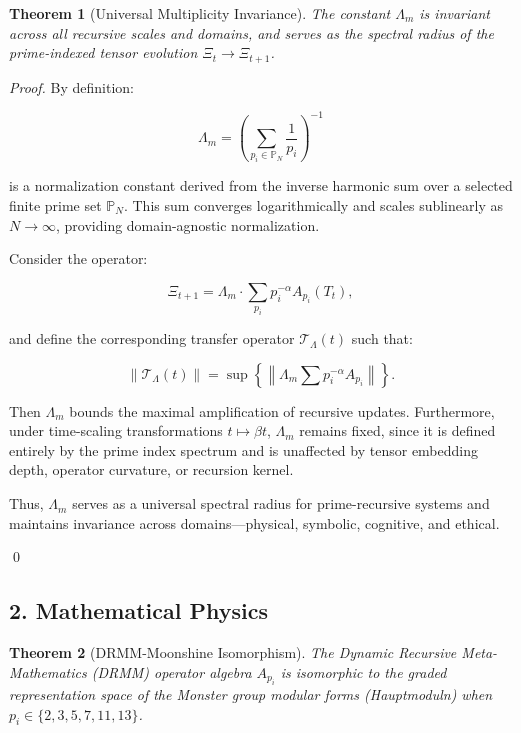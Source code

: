 \documentclass{article}
\theoremstyle{plain}
\newtheorem{theorem}{Theorem}
\begin{document}
\begin{theorem}[Universal Multiplicity Invariance]
The constant \( \Lambda_m \) is invariant across all recursive scales and domains, and serves as the spectral radius of the prime-indexed tensor evolution \( \Xi_t \rightarrow \Xi_{t+1} \).
\end{theorem}

\begin{proof}
By definition:

\[
\Lambda_m = \left( \sum_{p_i \in \mathbb{P}_N} \frac{1}{p_i} \right)^{-1}
\]

is a normalization constant derived from the inverse harmonic sum over a selected finite prime set \( \mathbb{P}_N \). This sum converges logarithmically and scales sublinearly as \( N \to \infty \), providing domain-agnostic normalization.

Consider the operator:

\[
\Xi_{t+1} = \Lambda_m \cdot \sum_{p_i} p_i^{-\alpha} A_{p_i}(T_t),
\]

and define the corresponding transfer operator \( \mathcal{T}_{\Lambda}(t) \) such that:

\[
\|\mathcal{T}_{\Lambda}(t)\| = \sup \left\{ \left\| \Lambda_m \sum p_i^{-\alpha} A_{p_i} \right\| \right\}.
\]

Then \( \Lambda_m \) bounds the maximal amplification of recursive updates. Furthermore, under time-scaling transformations \( t \mapsto \beta t \), \( \Lambda_m \) remains fixed, since it is defined entirely by the prime index spectrum and is unaffected by tensor embedding depth, operator curvature, or recursion kernel.

Thus, \( \Lambda_m \) serves as a universal spectral radius for prime-recursive systems and maintains invariance across domains—physical, symbolic, cognitive, and ethical.

\qed
\end{proof}


\subsection{2. Mathematical Physics}

\begin{theorem}[DRMM-Moonshine Isomorphism]
The Dynamic Recursive Meta-Mathematics (DRMM) operator algebra \( A_{p_i} \) is isomorphic to the graded representation space of the Monster group modular forms (Hauptmoduln) when \( p_i \in \{2, 3, 5, 7, 11, 13\} \).
\end{theorem}
\end{document}
